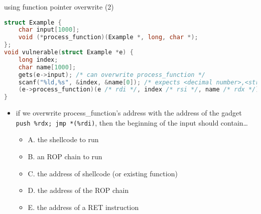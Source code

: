 \begin{frame}[fragile,label=useFPtrOverwrite2]{using function pointer overwrite (2)}
\begin{lstlisting}[language=C,style=script]
struct Example {
    char input[1000];
    void (*process_function)(Example *, long, char *);
};
void vulnerable(struct Example *e) {
    long index;
    char name[1000];
    gets(e->input); /* can overwrite process_function */
    scanf("%ld,%s", &index, &name[0]); /* expects <decimal number>,<string> */
    (e->process_function)(e /* rdi */, index /* rsi */, name /* rdx */);
}
\end{lstlisting}
\begin{itemize}
\item if we overwrite process\_function's address with the address of the gadget
    \texttt{push \%rdx; jmp *(\%rdi)}, then the beginning of the input should contain\ldots \\
    \begin{itemize}
    \item A. the shellcode to run
    \item B. an ROP chain to run
    \item C. the address of shellcode (or existing function) 
    \item D. the address of the ROP chain 
    \item E. the address of a RET instruction
    \end{itemize}
\end{itemize}
\end{frame}

